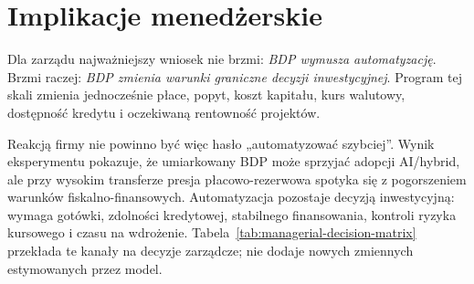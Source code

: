 \section{Implikacje menedżerskie}

Dla zarządu najważniejszy wniosek nie brzmi: \textit{BDP wymusza automatyzację}. Brzmi raczej: \textit{BDP zmienia warunki graniczne decyzji inwestycyjnej}. Program tej skali zmienia jednocześnie płace, popyt, koszt kapitału, kurs walutowy, dostępność kredytu i oczekiwaną rentowność projektów.

Reakcją firmy nie powinno być więc hasło „automatyzować szybciej”. Wynik eksperymentu pokazuje, że umiarkowany BDP może sprzyjać adopcji AI/hybrid, ale przy wysokim transferze presja płacowo-rezerwowa spotyka się z pogorszeniem warunków fiskalno-finansowych. Automatyzacja pozostaje decyzją inwestycyjną: wymaga gotówki, zdolności kredytowej, stabilnego finansowania, kontroli ryzyka kursowego i czasu na wdrożenie. Tabela~\ref{tab:managerial-decision-matrix} przekłada te kanały na decyzje zarządcze; nie dodaje nowych zmiennych estymowanych przez model.

